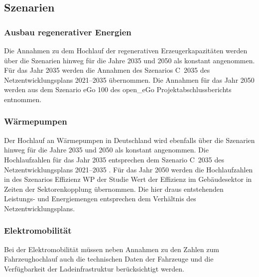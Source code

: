 \subsection{Szenarien}

\subsubsection{Ausbau regenerativer Energien}

Die Annahmen zu dem Hochlauf der regenerativen Erzeugerkapazitäten werden über die Szenarien hinweg für die Jahre \num{2035} und \num{2050} als konstant angenommen.
Für das Jahr \num{2035} werden die Annahmen des Szenarios C~\num{2035} des Netzentwicklungsplans \numrange[range-phrase=~{--}~]{2021}{2035} \cite{BNetzA2020} übernommen.
Die Annahmen für das Jahr \num{2050} werden aus dem Szenario eGo \num{100} des open\_eGo Projektabschlussberichts \cite{Mueller2019} entnommen.



\subsubsection{Wärmepumpen}

Der Hochlauf an Wärmepumpen in Deutschland wird ebenfalls über die Szenarien hinweg für die Jahre \num{2035} und \num{2050} als konstant angenommen.
Die Hochlaufzahlen für das Jahr \num{2035} entsprechen dem Szenario C~\num{2035} des Netzentwicklungsplans \numrange[range-phrase=~{--}~]{2021}{2035} \cite{BNetzA2020}.
Für das Jahr \num{2050} werden die Hochlaufzahlen in \si{\MioStk} des Szenarios Effizienz \Plus WP der Studie \glqq Wert der Effizienz im Gebäudesektor in Zeiten der Sektorenkopplung\grqq{} \cite{ifeu2018} übernommen.
Die hier draus entstehenden Leistungs- und Energiemengen entsprechen dem Verhältnis des Netzentwicklungsplans.



\subsubsection{Elektromobilität}\label{chap:EMob_Szenarien}

Bei der Elektromobilität müssen neben Annahmen zu den Zahlen zum Fahrzeughochlauf auch die technischen Daten der Fahrzeuge und die Verfügbarkeit der Ladeinfrastruktur berücksichtigt werden.

